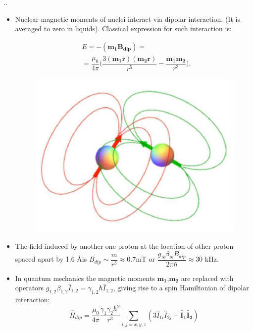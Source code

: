 \documentclass{beamer}
\begin{document}
\begin{frame}{\thesection.\thesubsection. \insertsubsection}
	\begin{itemize}[<+>]
		\item Nuclear magnetic moments of nuclei interact via dipolar interaction. (It is averaged to zero in liquids). Classical expression for such interaction is:
		
		\begin{minipage}[t]{0.45\textwidth}
			\begin{align*}
			&E  = -(\bm{m_1} \bm{B_{dip}})=  \\
			 &=\dfrac{\mu_0}{4 \pi} \Big(  \dfrac{ 3 (\bm{m_1}  \bm{r})  (\bm{m_2} \bm{r}) }{r^5} - \dfrac{  \bm{m_1} \bm{m_2}}{r^3}  \Big),
			\end{align*}
			
		\end{minipage}
		\hspace{0.1cm}
		\begin{minipage}[t]{0.40\textwidth}
			\begin{figure}
				\centering
				\includegraphics[scale=0.1]{dipolar_fields.png}
			\end{figure}
    	\end{minipage}
		
		\item The field induced by another one proton at the location of other proton spaced apart by 1.6 \AA  is $B_{dip} \sim \dfrac{m}{r^3} \approx 0.7$mT or $\dfrac{g_N \beta_N B_{dip}}{2 \pi \hbar} \approx 30$ kHz.
				
		
		\item In quantum mechanics the magnetic moments $\bm{m_1}$,$\bm{m_2}$ are replaced with operators  $g_{1,2} \beta_{1,2} \hat{I}_{1,2} = \gamma_{1,2} \hbar \hat{I}_{1,2}$, giving rise to a spin Hamiltonian of dipolar interaction:
		\begin{equation}
		   \hat{H}_{dip} = \dfrac{\mu_0}{4 \pi} \dfrac{\gamma_1 \gamma_2 \hbar^2  }{r^3} \sum_{i,j=x,y,z} ( 3 \hat{I}_{1i} \hat{I}_{2j} - \bm{\hat{I}_{1} \hat{I}_{2}} )
		\end{equation}

	\end{itemize}

\end{frame}
\end{document}
